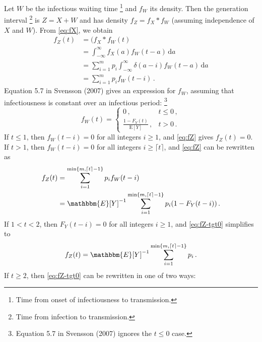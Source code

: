 \documentclass[12pt]{article}
\begin{document}
Let $W$ be the infectious waiting time%
\footnote{Time from onset of infectiousness to transmission.}
and $f_W$ its density. Then the generation interval%
\footnote{Time from infection to transmission.}
is $Z = X + W$ and has density $f_Z = f_X * f_W$
(assuming independence of $X$ and $W$).
From \eqref{eq:fX}, we obtain
%
\begin{equation}
  \label{eq:fZ}
  \begin{aligned}
    f_Z(t)
    &= (f_X * f_W(t) \\
    &= \int_{-\infty}^{\infty} f_X(a) f_W(t - a)\,\text{d}a \\
    &= \sum_{i=1}^{m} p_i \int_{-\infty}^{\infty} \delta(a - i) f_W(t - a)\,\text{d}a \\
    &= \sum_{i=1}^{m} p_i f_W(t - i)\,.
  \end{aligned}
\end{equation}
%
Equation 5.7 in Svensson (2007) gives an expression for $f_W$,
assuming that infectiousness is constant over an infectious period:%
\footnote{Equation 5.7 in Svensson (2007) ignores the $t \leq 0$ case.}
%
\begin{equation}
  \label{eq:fW}
  f_W(t) = \begin{cases} 0\,, & t \leq 0\,, \\ \frac{1 - F_Y(t)}{\mathrm{E}[Y]}\,, & t > 0\,. \end{cases}
\end{equation}
%
If $t \leq 1$, then $f_W(t - i) = 0$ for all integers $i \geq 1$,
and \eqref{eq:fZ} gives $f_Z(t) = 0$. If $t > 1$, then $f_W(t - i) = 0$
for all integers $i \geq \lceil t \rceil$, and \eqref{eq:fZ} can be
rewritten as
%
\begin{equation}
  \begin{aligned}
    \label{eq:fZ-tgt0}
    f_Z(t)
    &= \sum_{i=1}^{\min\{m, \lceil t \rceil-1\}} p_i f_W(t - i) \\
    &= \mathbbm{E}[Y]^{-1} \sum_{i=1}^{\min\{m, \lceil t \rceil-1\}} p_i (1 - F_Y(t - i))\,.
  \end{aligned}
\end{equation}
%
If $1 < t < 2$, then $F_Y(t - i) = 0$ for all integers $i \geq 1$,
and \eqref{eq:fZ-tgt0} simplifies to
%
\begin{equation}
  f_Z(t) = \mathbbm{E}[Y]^{-1} \sum_{i=1}^{\min\{m, \lceil t \rceil-1\}} p_i\,.
\end{equation}
%
If $t \geq 2$, then \eqref{eq:fZ-tgt0} can be rewritten in
one of two ways:
\end{document}
